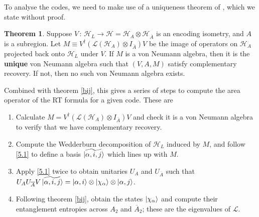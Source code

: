 \documentclass[12pt,a4paper]{report}
\numberwithin{equation}{section}
\newcommand{\ol}[1]{\overline{#1}}
\theoremstyle{definition}
\theoremstyle{theorem}
\newtheorem{theorem}{Theorem}[section]
\theoremstyle{theorem}
\theoremstyle{example}
\theoremstyle{definition}
\begin{document}
To analyse the codes, we need to make use of a uniqueness theorem of \cite{Pollack}, which we state without proof. 
\begin{theorem}
	Suppose $V\,:\,\mathcal{H}_{L}\to\mathcal{H}=\mathcal{H}_{A}\otimes\mathcal{H}_{\ol{A}}$ is an encoding isometry, and $A$ is a subregion. Let $M\equiv V^{\dagger}(\mathcal{L}(\mathcal{H}_{A})\otimes I_{\ol{A}})V$ be the image of operators on $\mathcal{H}_{A}$ projected back onto $\mathcal{H}_{L}$ under $V$. If $M$ is a von Neumann algebra, then it is the \textbf{unique} von Neumann algebra such that $(V,A,M)$ satisfy complementary recovery. If not, then no such von Neumann algebra exists.
\end{theorem}
Combined with theorem \ref{bij}, this gives a series of steps to compute the area operator of the RT formula for a given code. These are
\begin{enumerate}
	\item Calculate $M=V^{\dagger}(\mathcal{L}(\mathcal{H}_{A})\otimes I_{\ol{A}})V$ and check it is a von Neumann algebra to verify that we have complementary recovery.
	\item Compute the Wedderburn decomposition of $\mathcal{H}_{L}$ induced by $M$, and follow \ref{5.1} to define a basis $\ket{\widetilde{\alpha,i,j}}$ which lines up with $M$.
	\item Apply \ref{5.1} twice to obtain unitaries $U_{A}$ and $U_{\ol{A}}$ such that $U_{A}U_{\ol{A}}V\ket{\widetilde{\alpha,i,j}}=\ket{\alpha,i}\otimes\ket{\chi_{\alpha}}\otimes\ket{\alpha,j}$.
	\item Following theorem \ref{bij}, obtain the states $\ket{\chi_{\alpha}}$ and compute their entanglement entropies across $A_{2}$ and $\ol{A}_{2}$; these are the eigenvalues of $\mathcal{L}$.
\end{enumerate}
\end{document}
